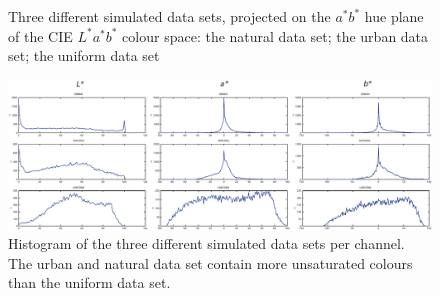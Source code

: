 \begin{figure}[htbp]
\centering
{}
\caption[Three different simulated data sets]{Three different
  simulated data sets, projected on the $a^*b^*$ hue plane of the CIE
  $L^*a^*b^*$ colour space:  the natural
  data set;  the urban data set;
   the uniform data set}
\label{f:simulated-data-sets}
\end{figure}

\begin{figure}[htbp]
\centering
\includegraphics[width=\textwidth]{./experiments/figures/data-sets-histogram.pdf}
\caption[Histogram of three different simulated data sets per
channel]{Histogram of the three different simulated data sets per
  channel. The urban and natural data set contain more unsaturated
  colours than the uniform data set.}
\label{f:data-sets-histogram}
\end{figure}

